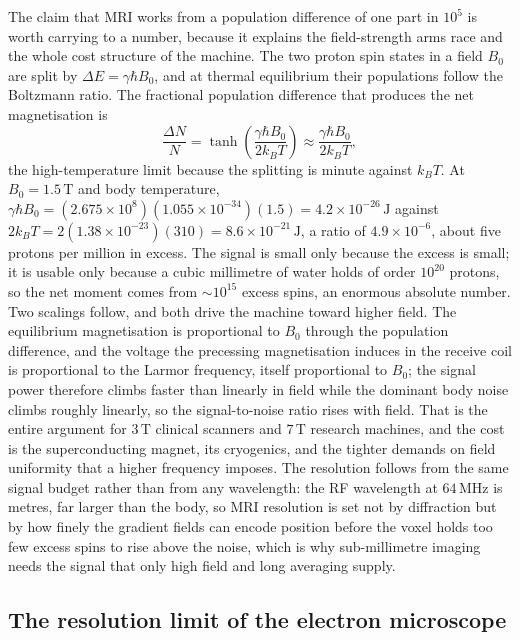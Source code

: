 The claim that MRI works from a population difference of one part in
$10^{5}$ is worth carrying to a number, because it explains the field-strength
arms race and the whole cost structure of the machine. The two proton spin
states in a field $B_0$ are split by $\Delta E = \gamma\hbar B_0$, and at
thermal equilibrium their populations follow the Boltzmann ratio. The
fractional population difference that produces the net magnetisation is
\[
\frac{\Delta N}{N} = \tanh\!\left(\frac{\gamma\hbar B_0}{2k_B T}\right)
\approx \frac{\gamma\hbar B_0}{2k_B T},
\]
the high-temperature limit because the splitting is minute against $k_B T$.
At $B_0 = 1.5\,\si{\tesla}$ and body temperature, $\gamma\hbar B_0 =
(2.675\times 10^{8})(1.055\times 10^{-34})(1.5) = 4.2\times 10^{-26}\,\si{
\joule}$ against $2k_B T = 2(1.38\times 10^{-23})(310) = 8.6\times 10^{-21}
\,\si{\joule}$, a ratio of $4.9\times 10^{-6}$, about five protons per million
in excess. The signal is small only because the excess is small; it is
usable only because a cubic millimetre of water holds of order $10^{20}$
protons, so the net moment comes from $\sim 10^{15}$ excess spins, an
enormous absolute number. Two scalings follow, and both drive the machine
toward higher field. The equilibrium magnetisation is proportional to $B_0$
through the population difference, and the voltage the precessing
magnetisation induces in the receive coil is proportional to the Larmor
frequency, itself proportional to $B_0$; the signal power therefore climbs
faster than linearly in field while the dominant body noise climbs roughly
linearly, so the signal-to-noise ratio rises with field. That is the entire
argument for $3\,\si{\tesla}$ clinical scanners and $7\,\si{\tesla}$ research
machines, and the cost is the superconducting magnet, its cryogenics, and the
tighter demands on field uniformity that a higher frequency imposes. The
resolution follows from the same signal budget rather than from any
wavelength: the RF wavelength at $64\,\si{\mega\hertz}$ is metres, far larger
than the body, so MRI resolution is set not by diffraction but by how finely
the gradient fields can encode position before the voxel holds too few excess
spins to rise above the noise, which is why sub-millimetre imaging needs the
signal that only high field and long averaging supply.

\subsection{The resolution limit of the electron microscope}

